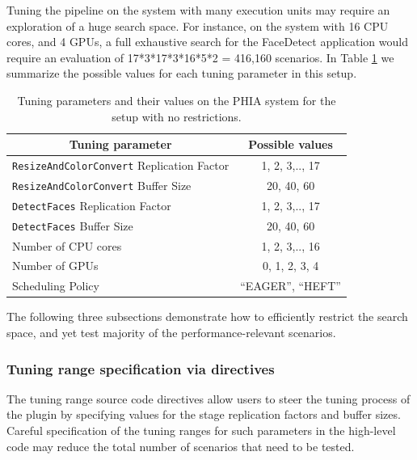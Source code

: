 
Tuning the pipeline on the system with many execution units may require an exploration of a huge search space. For instance, on the system with 16 CPU cores, and 4 GPUs, a full exhaustive search for the FaceDetect application would require an evaluation of 17*3*17*3*16*5*2 = 416,160 scenarios. In Table \ref{tab:fdfullspace} we summarize the possible values for each tuning parameter in this setup. 

\begin{table}[!h]
\begin{center}
\begin{tabular}{ @{} l @{} c }
\hline
\multicolumn{1}{c}{\textbf{ Tuning parameter }} & \textbf{ Possible values } \\
\hline
\hline
{ \texttt{ResizeAndColorConvert} Replication Factor}  & {1, 2, 3,.., 17} \\ \hline 
{ \texttt{ResizeAndColorConvert} Buffer Size} & {20, 40, 60}  \\ \hline  
{ \texttt{DetectFaces} Replication Factor}  &  {1, 2, 3,.., 17} \\ \hline 
{ \texttt{DetectFaces} Buffer Size} & {20, 40, 60} \\ \hline   
{ Number of CPU cores} & {1, 2, 3,.., 16} \\ \hline 
{ Number of GPUs} & {0, 1, 2, 3, 4} \\ \hline 
{ Scheduling Policy} & {``EAGER'', ``HEFT''}  \\ \hline 
\end{tabular}
\vspace{4pt}
\caption{Tuning parameters and their values on the PHIA system for the setup with no restrictions. }
\label{tab:fdfullspace}
\end{center}
\end{table}

The following three subsections demonstrate how to efficiently restrict the search space, and yet test majority of the performance-relevant scenarios. 
  
\subsubsection{Tuning range specification via directives}
The tuning range source code directives allow users to steer the tuning process of the plugin by specifying values for the stage replication factors and buffer sizes. 
Careful specification of the tuning ranges for such parameters in the high-level code may reduce the total number of scenarios that need to be tested.

